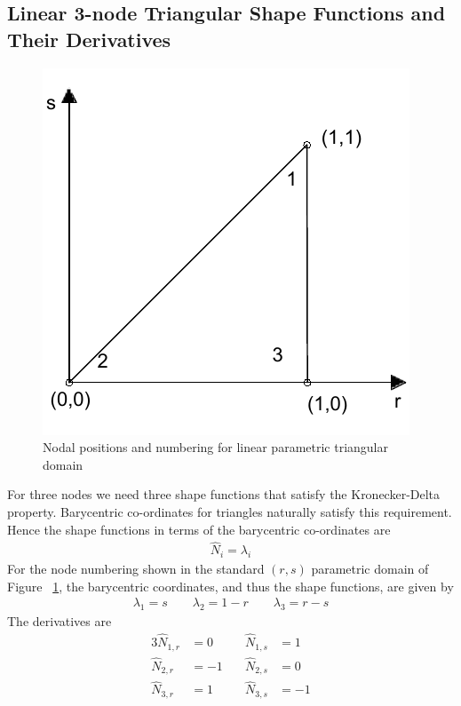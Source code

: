 \documentclass[../main.tex]{subfiles}
\begin{document}
\subsection{Linear 3-node Triangular Shape Functions and Their
  Derivatives}
\begin{figure}[h]
  \centering
  \includegraphics[scale=1]{./img/linearDomain.pdf}
  \caption{Nodal positions and numbering for linear parametric
    triangular domain}
  \label{fig:linDom}
\end{figure}
For three nodes we need three shape functions that satisfy the
Kronecker-Delta property. Barycentric co-ordinates for triangles
naturally satisfy this requirement. Hence the shape functions in terms
of the barycentric co-ordinates are
\begin{align*}
  \hat{N}_i = \lambda_i
\end{align*}
For the node numbering shown in the standard $(r,s)$ parametric domain
of Figure ~\ref{fig:linDom}, the barycentric coordinates, and thus the
shape functions, are given by
\begin{align}
  \label{eq:bary}
  \lambda_1 = s \qquad \lambda_2 = 1-r \qquad \lambda_3 = r-s
\end{align}
The derivatives are
\begin{alignat*}{3}
  \hat{N}_{1,r} &= 0 &\quad\hat{N}_{1,s} &= 1 \\
  \hat{N}_{2,r} &= -1& \quad\hat{N}_{2,s}&= 0 \\
  \hat{N}_{3,r} &= 1 & \quad\hat{N}_{3,s}&= -1
\end{alignat*}
\end{document}
